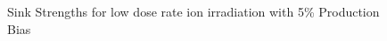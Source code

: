 \documentclass[a4paper]{article}
\begin{document}
      \begin{figure}[h!]  %
        \centering
        \qquad
        \caption{Sink Strengths for low dose rate ion irradiation with 5\% Production Bias}
        \label{figure:sink_strengths_ion_5_1e-6}
      \end{figure}
\end{document}
